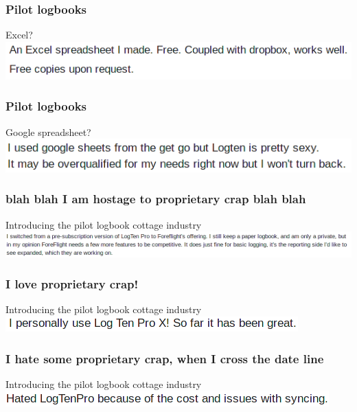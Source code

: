 \begin{frame}
\frametitle{Pilot logbooks}
\begin{center}{Excel?}
\includegraphics[height=0.1\textheight]{image/logbook-1.png}
\end{center}
\end{frame}

\begin{frame}
\frametitle{Pilot logbooks}
\begin{center}{Google spreadsheet?}
\includegraphics[height=0.1\textheight]{image/logbook-2.png}
\end{center}
\end{frame}

\begin{frame}
\frametitle{blah blah I am hostage to proprietary crap blah blah}
\begin{block}{Introducing the pilot logbook cottage industry}
\includegraphics[height=0.08\textheight]{image/logbook-3.png}
\end{block}
\end{frame}

\begin{frame}
\frametitle{I love proprietary crap!}
\begin{block}{Introducing the pilot logbook cottage industry}
\includegraphics[height=0.05\textheight]{image/logbook-4.png}
\end{block}
\end{frame}

\begin{frame}
\frametitle{I hate some proprietary crap, when I cross the date line}
\begin{block}{Introducing the pilot logbook cottage industry}
\includegraphics[height=0.05\textheight]{image/logbook-5.png}
\end{block}
\end{frame}


